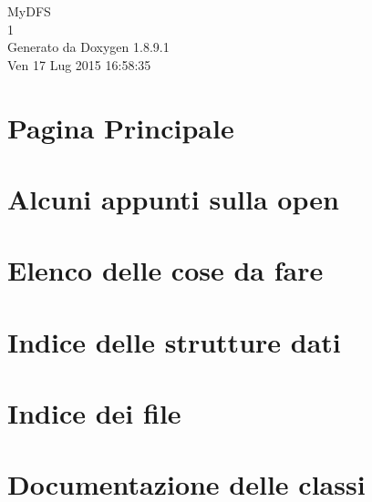 \documentclass[twoside]{book}
\newcommand{\+}{\discretionary{\mbox{\scriptsize$\hookleftarrow$}}{}{}}
\newcommand{\clearemptydoublepage}{%
  \newpage{\pagestyle{empty}\cleardoublepage}%
}
\begin{document}
\hypersetup{pageanchor=false,
             bookmarks=true,
             bookmarksnumbered=true,
             pdfencoding=unicode
            }
\begin{titlepage}
\vspace*{7cm}
\begin{center}%
{\Large My\+D\+F\+S \\[1ex]\large 1 }\\
\vspace*{1cm}
{\large Generato da Doxygen 1.8.9.1}\\
\vspace*{0.5cm}
{\small Ven 17 Lug 2015 16:58:35}\\
\end{center}
\end{titlepage}
\clearemptydoublepage
\tableofcontents
\clearemptydoublepage
{}
\hypersetup{pageanchor=true}

\chapter{Pagina Principale}
\label{index}\hypertarget{index}{}
\chapter{Alcuni appunti sulla open}
\label{md_OPE}
\hypertarget{md_OPE}{}

\chapter{Elenco delle cose da fare}
\label{todo}
\hypertarget{todo}{}

\chapter{Indice delle strutture dati}

\chapter{Indice dei file}

\chapter{Documentazione delle classi}



\end{document}
